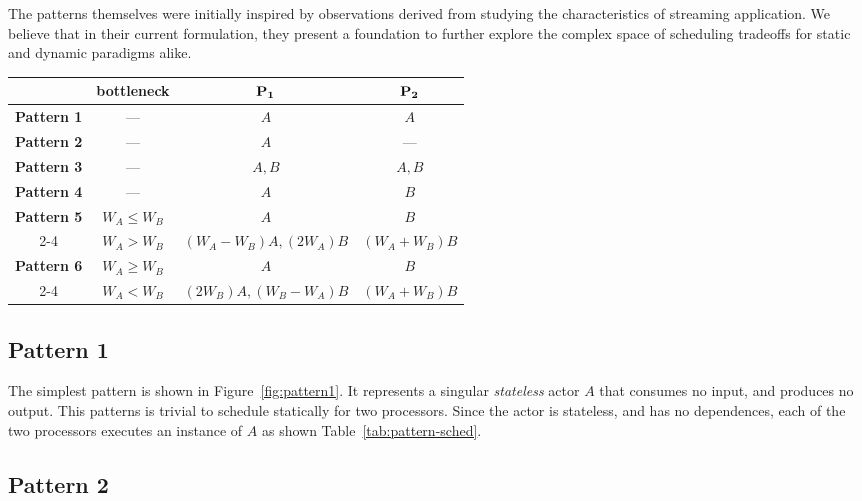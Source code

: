 The patterns themselves were initially inspired by observations
derived from studying the characteristics of streaming application. We
believe that in their current formulation, they present a foundation
to further explore the complex space of scheduling tradeoffs for
static and dynamic paradigms alike.

\begin{table*}[t]
\center
\caption{\small Maximum efficiency static schedules for the stream graph patterns.}
{\small
\begin{tabular}{|c|c|c|c|} \hline
                 & {\bf bottleneck} & ${\bf P_1}$  & ${\bf P_2}$ \\ \hline
{\bf Pattern 1}  & ---              & $A$     & $A$ \\ \hline
{\bf Pattern 2}  & ---              & $A$     & --- \\ \hline
{\bf Pattern 3}  & ---              & $A, B$  & $A, B$ \\ \hline
{\bf Pattern 4}  & ---              & $A$     & $B$ \\ \hline
{\bf Pattern 5}  & $W_A \le W_B$    & $A$     & $B$ \\ \cline{2-4}
                 & $W_A > W_B$      & $(W_A - W_B) A, (2W_A) B$ & $(W_A + W_B) B$ \\ \hline
{\bf Pattern 6}  & $W_A \ge W_B$    & $A$     & $B$ \\ \cline{2-4}
                 & $W_A < W_B$      & $(2W_B) A, (W_B - W_A) B$ & $(W_A + W_B) B$ \\ \hline
\end{tabular}}
\label{tab:pattern-sched}
\end{table*}


\subsection{Pattern 1}

The simplest pattern is shown in Figure~\ref{fig:pattern1}. It
represents a singular {\it stateless} actor $A$ that consumes no
input, and produces no output.
This patterns is trivial to schedule statically for two
processors. Since the actor is stateless, and has no dependences, each
of the two processors executes an instance of $A$ as shown Table~\ref{tab:pattern-sched}.

\subsection{Pattern 2}

